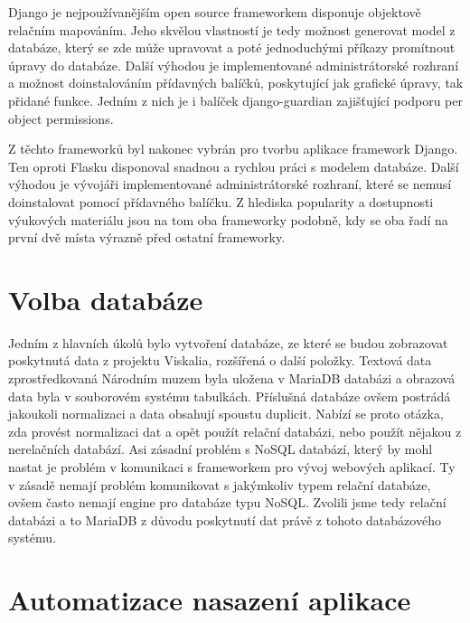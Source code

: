 Django je nejpoužívanějším open source frameworkem disponuje objektově
relačním mapováním. Jeho skvělou vlastností je tedy možnost generovat
model z databáze, který se zde může upravovat a poté jednoduchými
příkazy promítnout úpravy do databáze. Další výhodou je implementované
administrátorské rozhraní a možnost doinstalováním přídavných balíčků,
poskytující jak grafické úpravy, tak přidané funkce. Jedním z nich je
i balíček django-guardian zajišťující podporu per object permissions.


Z těchto frameworků byl nakonec vybrán pro tvorbu aplikace framework
Django. Ten oproti Flasku disponoval snadnou a rychlou práci s modelem
databáze. Další výhodou je vývojáři implementované administrátorské
rozhraní, které se nemusí doinstalovat pomocí přídavného balíčku. Z
hlediska popularity a dostupnosti výukových materiálu jsou na tom oba
frameworky podobně, kdy se oba řadí na první dvě místa výrazně před
ostatní frameworky.

\vspace{10px}

\section{Volba databáze}

Jedním z hlavních úkolů bylo vytvoření databáze, ze které se budou
zobrazovat poskytnutá data z projektu Viskalia, rozšířená o další
položky. Textová data zprostředkovaná Národním muzem byla uložena 
v MariaDB databázi a obrazová data byla v souborovém systému
tabulkách. Příslušná databáze ovšem postrádá jakoukoli normalizaci a
data obsahují spoustu duplicit. Nabízí se proto otázka, zda provést
normalizaci dat a opět použít relační databázi, nebo použít nějakou z
nerelačních databází. Asi zásadní problém s NoSQL databází, který by
mohl nastat je problém v komunikaci s frameworkem pro vývoj webových
aplikací. Ty v zásadě nemají problém komunikovat s jakýmkoliv typem
relační databáze, ovšem často nemají engine pro databáze typu
NoSQL. Zvolili jsme tedy relační databázi a to MariaDB z důvodu poskytnutí 
dat právě z tohoto databázového systému.

\section{Automatizace nasazení aplikace}


